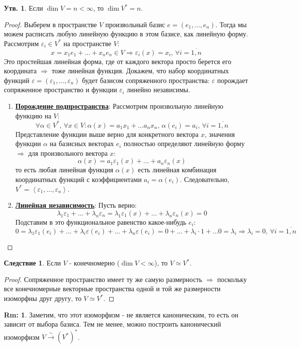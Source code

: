 \documentclass[12pt]{article}
\newcommand{\VE}{\varepsilon}
\theoremstyle{definition}
\newtheorem{rem}{Rm:}
\newtheorem{prop}{Утв.}
\newtheorem{corollary}{Следствие}
\newcommand{\linsp}[1]{\left\langle #1 \right\rangle }
\begin{document}
\begin{prop}
	Если $\dim{V}= n < \infty$, то $\dim{V^*} = n$.
\end{prop}
\begin{proof}
	Выберем в пространстве $V$ произвольный базис $e = (e_1, \dotsc, e_n)$. Тогда мы можем расписать любую линейную функцию в этом базисе, как линейную форму. Рассмотрим  $\VE_i \in V^*$ на пространстве $V$: 
	$$
		x = x_1e_1 + \dotsc + x_n e_n \in V \Rightarrow \VE_i(x) = x_i, \, \forall i = \overline{1,n}
	$$
	Это простейшая линейная форма, где от каждого вектора просто берется его координата $\Rightarrow$ тоже линейная функция. Докажем, что набор координатных функций $\VE = (\VE_1,\dotsc, \VE_n)$ будет базисом сопряженного пространства: $\VE$ порождает сопряженное пространство и функции $\VE_i$ линейно независимы.
	\begin{enumerate}[label=\arabic*)]
		\item \textbf{\uline{Порождение подпространства}}: Рассмотрим произвольную линейную функцию на $V$:
		$$
			\forall \alpha \in V^*, \, \forall x \in V \colon \alpha(x) = a_1x_1 + \dotsc a_n x_n, \, \alpha(e_i) = a_i, \, \forall i = \overline{1,n}
		$$
		Представление функции выше верно для конкретного вектора $x$, значения функции $\alpha$ на базисных векторах $e_i$ полностью определяют линейную форму $\Rightarrow$ для произвольного вектора $x$:
		$$
			\alpha(x) = a_1\VE_1(x) + \dotsc + a_n\VE_n(x)
		$$
		то есть любая линейная функция $\alpha(x)$ есть линейная комбинация координатных функций с коэффициентами $a_i = \alpha(e_i)$. Следовательно, $V^* = \linsp{\VE_1, \dotsc, \VE_n}$. 
		\item \textbf{\uline{Линейная независимость}}: Пусть верно:
		$$
			\lambda_1 \VE_1 + \dotsc + \lambda_n \VE_n= \lambda_1 \VE_1(x) + \dotsc + \lambda_n \VE_n(x) = 0
		$$
		Подставим в это функциональное равенство какое-нибудь $e_i$:
		$$
			0 =\lambda_1 \VE_1(e_i) + \dotsc + \lambda_i \VE(e_i) + \dotsc + \lambda_n \VE(e_i) = 0 + \dotsc + \lambda_i{\cdot}1 + \dotsc 0 = \lambda_i \Rightarrow \lambda_i = 0, \,  \forall i = \overline{1,n}
		$$
	\end{enumerate}
\end{proof}
\newpage

\begin{corollary}
	Если $V$ - конечномерно ($\dim{V} < \infty$), то $V \simeq V^*$.
\end{corollary}
\begin{proof}
	Сопряженное пространство имеет ту же самую размерность $\Rightarrow$ поскольку все конечномерные векторные пространства одной и той же размерности изоморфны друг другу, то $V \simeq V^*$.
\end{proof}
\begin{rem}
	Заметим, что этот изоморфизм - не является каноническим, то есть он зависит от выбора базиса. Тем не менее, можно построить канонический изоморфизм $V \xrightarrow[]{\sim} (V^*)^*$.
\end{rem}
\end{document}

